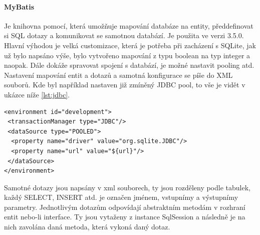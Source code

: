 \paragraph{MyBatis} 
Je knihovna pomocí, která umožňuje mapování databáze na entity, předdefinovat si SQL dotazy a komunikovat se samotnou databází. Je použita ve verzi 3.5.0. Hlavní výhodou je velká customizace, která je potřeba při zacházení s SQLite, jak už bylo napsáno výše, bylo vytvořeno mapování z typu boolean na typ integer a naopak. Dále dokáže spravovat spojení s databází, je možné nastavit pooling atd. Nastavení mapování entit a dotazů a samotná konfigurace se píše do XML souborů. Kde byl například nastaven již zmíněný JDBC pool, to vše je vidět v ukázce níže \ref{lst:jdbc}.

\begin{lstlisting}[caption=Konfigurace JDBC poolu, label={lst:jdbc}]
<environment id="development">
 <transactionManager type="JDBC"/>
 <dataSource type="POOLED">
  <property name="driver" value="org.sqlite.JDBC"/>
  <property name="url" value="${url}"/>
 </dataSource>
</environment>
\end{lstlisting}

Samotné dotazy jsou napsány v xml souborech, ty jsou rozděleny podle tabulek, každý SELECT, INSERT atd. je označen jménem, vstupnímy a výstupnímy parametry. Jednotlivým dotazům odpovídají abstraktním metodám v rozhraní entit nebo-li interface. Ty jsou vytaženy z instance SqlSession a následně je na nich zavolána daná metoda, která vykoná daný dotaz. 
